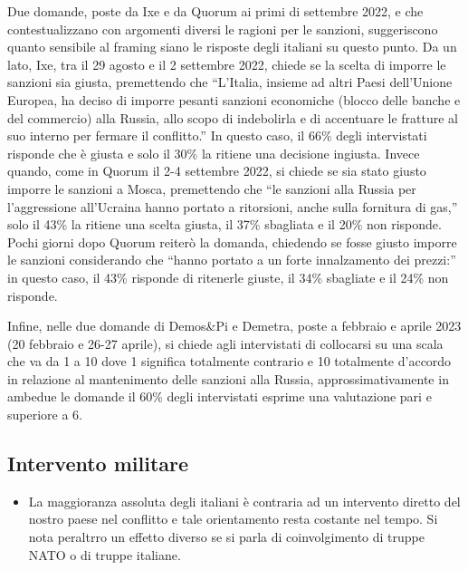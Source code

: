 \documentclass[
  openany]{book}
\providecommand{\tightlist}{%
  \setlength{\itemsep}{0pt}\setlength{\parskip}{0pt}}
\begin{document}
Due domande, poste da Ixe e da Quorum ai primi di settembre 2022, e che contestualizzano con argomenti diversi le ragioni per le sanzioni, suggeriscono quanto sensibile al framing siano le risposte degli italiani su questo punto. Da un lato, Ixe, tra il 29 agosto e il 2 settembre 2022, chiede se la scelta di imporre le sanzioni sia giusta, premettendo che ``L'Italia, insieme ad altri Paesi dell'Unione Europea, ha deciso di imporre pesanti sanzioni economiche (blocco delle banche e del commercio) alla Russia, allo scopo di indebolirla e di accentuare le fratture al suo interno per fermare il conflitto.'' In questo caso, il 66\% degli intervistati risponde che è giusta e solo il 30\% la ritiene una decisione ingiusta. Invece quando, come in Quorum il 2-4 settembre 2022, si chiede se sia stato giusto imporre le sanzioni a Mosca, premettendo che ``le sanzioni alla Russia per l'aggressione all'Ucraina hanno portato a ritorsioni, anche sulla fornitura di gas,'' solo il 43\% la ritiene una scelta giusta, il 37\% sbagliata e il 20\% non risponde. Pochi giorni dopo Quorum reiterò la domanda, chiedendo se fosse giusto imporre le sanzioni considerando che ``hanno portato a un forte innalzamento dei prezzi:'' in questo caso, il 43\% risponde di ritenerle giuste, il 34\% sbagliate e il 24\% non risponde.

Infine, nelle due domande di Demos\&Pi e Demetra, poste a febbraio e aprile 2023 (20 febbraio e 26-27 aprile), si chiede agli intervistati di collocarsi su una scala che va da 1 a 10 dove 1 significa totalmente contrario e 10 totalmente d'accordo in relazione al mantenimento delle sanzioni alla Russia, approssimativamente in ambedue le domande il 60\% degli intervistati esprime una valutazione pari e superiore a 6.

\hypertarget{intervento-militare}{%
\subsection{Intervento militare}\label{intervento-militare}}

\begin{itemize}
\tightlist
\item
  La maggioranza assoluta degli italiani è contraria ad un intervento diretto del nostro paese nel conflitto e tale orientamento resta costante nel tempo. Si nota peraltrro un effetto diverso se si parla di coinvolgimento di truppe NATO o di truppe italiane.
\end{itemize}
\end{document}
